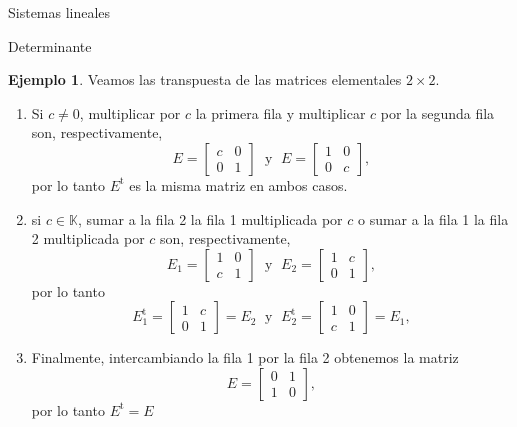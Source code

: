 \documentclass[a4paper,12pt,twoside,spanish,reqno]{amsbook}
\theoremstyle{definition}
\newtheorem{ejemplo}{Ejemplo}[section]
\theoremstyle{remark}
\renewcommand{\t}{{\operatorname{t}}}
\newcommand{\K}{\mathbb K}
\begin{document}
\begin{chapter}{Sistemas lineales}
\begin{section}{Determinante}
    \begin{ejemplo} Veamos las transpuesta de las matrices elementales  $2 \times 2$.
        \begin{enumerate}
            \item Si $c \not=0$, multiplicar por  $c$ la primera fila y multiplicar $c$ por la segunda fila son, respectivamente,
            \begin{equation*}
            E = \begin{bmatrix} c& 0\\ 0&1\end{bmatrix}\;\text{ y }\; E = \begin{bmatrix} 1& 0\\ 0&c\end{bmatrix},
            \end{equation*}
            por lo tanto $E^\t$ es la misma matriz en ambos casos. 
            \item si  $c \in \K$, sumar a la fila 2 la fila 1 multiplicada por $c$ o sumar a la fila 1 la fila 2 multiplicada por $c$ son, respectivamente,
            \begin{equation*}
            E_1 = \begin{bmatrix} 1& 0\\ c&1\end{bmatrix}\;\text{ y }\; E_2 = \begin{bmatrix} 1& c\\ 0&1\end{bmatrix},
            \end{equation*}
            por lo tanto 
            \begin{equation*}
            E_1^\t = \begin{bmatrix} 1& c\\ 0&1\end{bmatrix} = E_2 \;\text{ y }\; E_2^\t = \begin{bmatrix} 1& 0\\ c&1\end{bmatrix} =E_1,
            \end{equation*}
            \item Finalmente, intercambiando la fila 1 por la fila 2 obtenemos la matriz
            \begin{equation*}
            E = \begin{bmatrix} 0& 1\\ 1&0\end{bmatrix},
            \end{equation*}
            por lo tanto $E^\t =E$
        \end{enumerate}
    \end{ejemplo}
    


\end{section}
\end{chapter}
\end{document}
